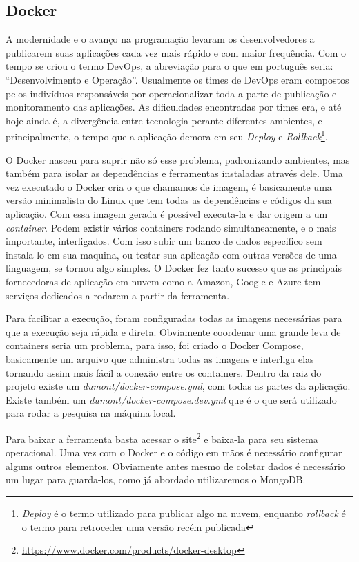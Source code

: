 \subsection{Docker}
A modernidade e o avanço na programação levaram os desenvolvedores a publicarem suas aplicações cada vez mais rápido e com maior frequência. Com o tempo se criou o termo DevOps, a abreviação para o que em português seria: “Desenvolvimento e Operação”. Usualmente os times de DevOps eram compostos pelos indivíduos responsáveis por operacionalizar toda a parte de publicação e monitoramento das aplicações. As dificuldades encontradas por times era, e até hoje ainda é, a divergência entre tecnologia perante diferentes ambientes, e principalmente, o tempo que a aplicação demora em seu \textit{Deploy} e \textit{Rollback}\footnote{\textit{Deploy} é o termo utilizado para publicar algo na nuvem, enquanto \textit{rollback} é o termo para retroceder uma versão recém publicada}.

O Docker nasceu para suprir não só esse problema, padronizando ambientes, mas também para isolar as dependências e ferramentas instaladas através dele. Uma vez executado o Docker cria o que chamamos de imagem, é basicamente uma versão minimalista do Linux que tem todas as dependências e códigos da sua aplicação. Com essa imagem gerada é possível executa-la e dar origem a um \textit{container}. Podem existir vários containers rodando simultaneamente, e o mais importante, interligados. Com isso subir um banco de dados especifico sem instala-lo em sua maquina, ou testar sua aplicação com outras versões de uma linguagem, se tornou algo simples. O Docker fez tanto sucesso que as principais fornecedoras de aplicação em nuvem como a Amazon, Google e Azure tem serviços dedicados a rodarem a partir da ferramenta.

Para facilitar a execução, foram configuradas todas as imagens necessárias para que a execução seja rápida e direta. Obviamente coordenar uma grande leva de containers seria um problema, para isso, foi criado o Docker Compose, basicamente um arquivo que administra todas as imagens e interliga elas tornando assim mais fácil a conexão entre os containers. Dentro da raiz do projeto existe um \textit{dumont/docker-compose.yml}, com todas as partes da aplicação. Existe também um \textit{dumont/docker-compose.dev.yml} que é o que será utilizado para rodar a pesquisa na máquina local.

Para baixar a ferramenta basta acessar o site\footnote{\url{https://www.docker.com/products/docker-desktop}} e baixa-la para seu sistema operacional. Uma vez com o Docker e o código em mãos é necessário configurar alguns outros elementos. Obviamente antes mesmo de coletar dados é necessário um lugar para guarda-los, como já abordado utilizaremos o MongoDB.

